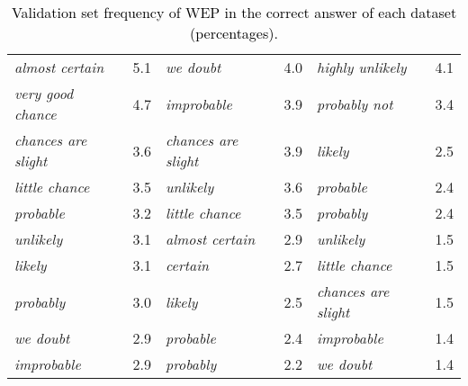 \documentclass[11pt]{article}
\def \thecolor {black}
\newcommand{\blue}[1]{\textcolor{\thecolor}{#1}}
\begin{document}
{\begin{table}[H]
\begin{tabular}{lrlrlr}
    \textit{almost certain} &               5.1 &           \textit{we doubt} &               4.0 &    \textit{highly unlikely} &               4.1 \\
  \textit{very good chance} &               4.7 &         \textit{improbable} &               3.9 &       \textit{probably not} &               3.4 \\
\textit{chances are slight} &               3.6 & \textit{chances are slight} &               3.9 &             \textit{likely} &               2.5 \\
     \textit{little chance} &               3.5 &           \textit{unlikely} &               3.6 &           \textit{probable} &               2.4 \\
          \textit{probable} &               3.2 &      \textit{little chance} &               3.5 &           \textit{probably} &               2.4 \\
          \textit{unlikely} &               3.1 &     \textit{almost certain} &               2.9 &           \textit{unlikely} &               1.5 \\
            \textit{likely} &               3.1 &            \textit{certain} &               2.7 &      \textit{little chance} &               1.5 \\
          \textit{probably} &               3.0 &             \textit{likely} &               2.5 & \textit{chances are slight} &               1.5 \\
          \textit{we doubt} &               2.9 &           \textit{probable} &               2.4 &         \textit{improbable} &               1.4 \\
        \textit{improbable} &               2.9 &           \textit{probably} &               2.2 &           \textit{we doubt} &               1.4 \\
\bottomrule
\end{tabular}
\caption{\blue{Validation set frequency of WEP in the correct answer of each dataset (percentages).}}
\end{table}
}
\end{document}
